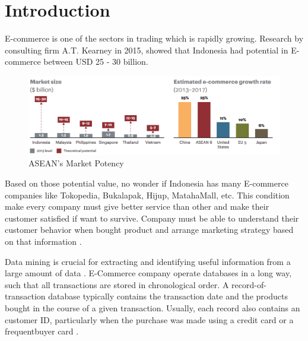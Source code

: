 \documentclass[conference]{IEEEtran}
\begin{document}
%
\IEEEpeerreviewmaketitle



\section{Introduction}
E-commerce is one of the sectors in trading which is rapidly growing. Research by consulting firm A.T. Kearney in 2015, showed that Indonesia had potential in E-commerce between USD
25 - 30 billion.

\begin{figure}[h]
\centering
\includegraphics[width=\columnwidth]{figure/marketpotency}
\caption{ASEAN's Market Potency}
\label{market_potency}
\end{figure}

Based on those potential value, no wonder if Indonesia has many E-commerce companies like Tokopedia, Bukalapak, Hijup, MatahaMall, etc. This condition make every company must give better service than other and make their customer satisfied if want to survive. Company must be able to understand their customer behavior when bought product and arrange marketing strategy based on that information \cite{Tsiptsis}.

Data mining is crucial for extracting and identifying useful information from a large amount of data \cite{Ahmed}. E-Commerce company operate databases in a long way, such that all transactions are stored in chronological order. A record-of-transaction database typically contains the transaction date and the products bought in the course of a given transaction. Usually, each record also contains an customer ID, particularly when the purchase was made using a credit card or a frequentbuyer card \cite{Ahmed}.
\end{document}
